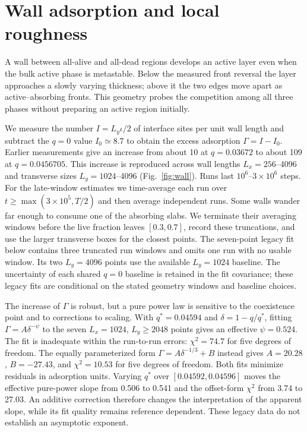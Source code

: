 \section{Wall adsorption and local roughness}
\label{sec:swall}

A wall between all-alive and all-dead regions develops an active layer even when
the bulk active phase is metastable. Below the measured front reversal the
layer approaches a slowly varying thickness; above it the two edges move apart as active--absorbing
fronts. This geometry probes the competition among all three phases without
preparing an active region initially.

We measure the number $I=L_y\iota/2$ of interface sites per unit wall length and subtract
the $q=0$ value $I_0\simeq8.7$ to obtain the excess adsorption
$\Gamma=I-I_0$. Earlier measurements give an increase from about 10 at
$q=0.03672$ to about 109 at $q=0.0456705$. This increase is reproduced
across wall lengths $L_x=256$--4096 and transverse sizes $L_y=1024$--4096
(Fig.~\ref{fig:wall}). Runs last $10^6$--$3\times10^6$ steps.
For the late-window estimates we time-average each run over
$t\ge\max(3\times10^5,T/2)$ and then average independent runs.
Some walls wander far enough to consume one of the absorbing slabs. We terminate
their averaging windows before the live fraction leaves $[0.3,0.7]$, record
these truncations, and use the larger transverse boxes for the closest points.
The seven-point legacy fit below contains three truncated run windows and
omits one run with no usable window. Its two $L_y=4096$ points use the
available $L_y=1024$ baseline. The uncertainty of each shared $q=0$ baseline
is retained in the fit covariance; these legacy fits are conditional on the
stated geometry windows and baseline choices.

The increase of $\Gamma$ is robust, but a pure power law is sensitive to the
coexistence point and to corrections to scaling. With $q^*=0.04594$ and
$\delta=1-q/q^*$, fitting $\Gamma=A\delta^{-\psi}$ to the seven
$L_x=1024$, $L_y\ge2048$ points gives an effective $\psi=0.524$.
The fit is inadequate within the run-to-run errors: $\chi^2=74.7$ for five
degrees of freedom. The equally parameterized form
$\Gamma=A\delta^{-1/3}+B$ instead gives $A=20.28$, $B=-27.43$, and
$\chi^2=10.53$ for five degrees of freedom. Both fits minimize residuals in
adsorption units. Varying $q^*$ over $[0.04592,0.04596]$ moves the effective
pure-power slope from 0.506 to 0.541 and the offset-form $\chi^2$ from
3.74 to 27.03. An additive correction therefore changes the interpretation
of the apparent slope, while its fit quality remains reference dependent.
These legacy data do not establish an asymptotic exponent.

